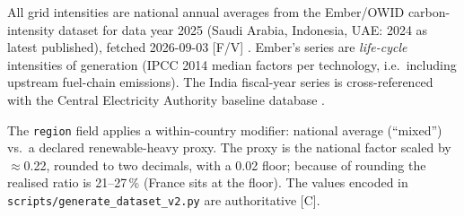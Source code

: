 \documentclass[11pt,a4paper]{article}
\begin{document}
All grid intensities are national annual averages from the Ember/OWID
carbon-intensity dataset for data year 2025 (Saudi Arabia, Indonesia,
UAE: 2024 as latest published), fetched 2026-09-03 [F/V]
\cite{ember_grid}. Ember's series are \emph{life-cycle} intensities of
generation (IPCC 2014 median factors per technology, i.e.\ including
upstream fuel-chain emissions). The India fiscal-year series is
cross-referenced with the Central Electricity Authority baseline
database \cite{cea_baseline, wiki_india_electricity}.

The \texttt{region} field applies a within-country modifier: national
average (``mixed'') vs.\ a declared renewable-heavy proxy. The proxy is
the national factor scaled by $\approx$0.22, rounded to two decimals,
with a 0.02 floor; because of rounding the realised ratio is 21--27\,\%
(France sits at the floor). The values encoded in
\texttt{scripts/generate\_dataset\_v2.py} are authoritative [C].
\end{document}
